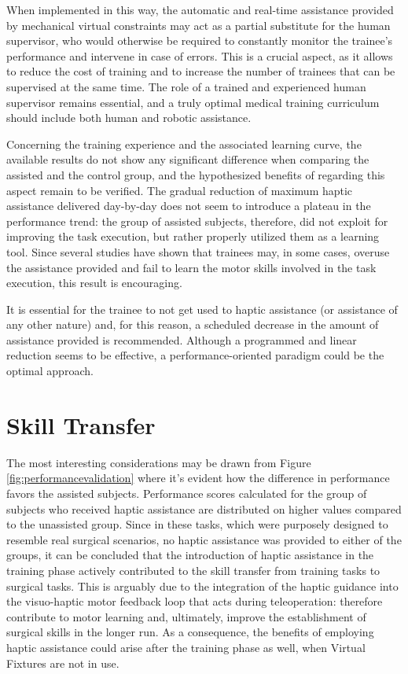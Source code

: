 \documentclass[../main.tex]{subfiles}
\begin{document}
When implemented in this way, the automatic and real-time assistance provided by mechanical virtual constraints may act as a partial substitute for the human supervisor, who would otherwise be required to constantly monitor the trainee's performance and intervene in case of errors. This is a crucial aspect, as it allows to reduce the cost of training and to increase the number of trainees that can be supervised at the same time. The role of a trained and experienced human supervisor remains essential, and a truly optimal medical training curriculum should include both human and robotic assistance. 

Concerning the training experience and the associated learning curve, the available results do not show any significant difference when comparing the assisted and the control group, and the hypothesized benefits of \vfs regarding this aspect remain to be verified. The gradual reduction of maximum haptic assistance delivered day-by-day does not seem to introduce a plateau in the performance trend: the group of assisted subjects, therefore, did not exploit \vfs for improving the task execution, but rather properly utilized them as a learning tool. Since several studies have shown that trainees may, in some cases, overuse the assistance provided and fail to learn the motor skills involved in the task execution, this result is encouraging.

It is essential for the trainee to not get used to haptic assistance (or assistance of any other nature) and, for this reason, a scheduled decrease in the amount of assistance provided is recommended. Although a programmed and linear reduction seems to be effective, a performance-oriented paradigm could be the optimal approach.

\section{Skill Transfer}

The most interesting considerations may be drawn from Figure \ref{fig:performancevalidation} where it's evident how the difference in performance favors the assisted subjects. Performance scores calculated for the group of subjects who received haptic assistance are distributed on higher values compared to the unassisted group. 
Since in these tasks, which were purposely designed to resemble real surgical scenarios, no haptic assistance was provided to either of the groups, it can be concluded that the introduction of haptic assistance in the training phase actively contributed to the skill transfer from training tasks to surgical tasks. This is arguably due to the integration of the haptic guidance into the visuo-haptic motor feedback loop that acts during teleoperation: \vfs therefore contribute to motor learning and, ultimately, improve the establishment of surgical skills in the longer run. As a consequence, the benefits of employing haptic assistance could arise after the training phase as well, when Virtual Fixtures are not in use.
\end{document}
